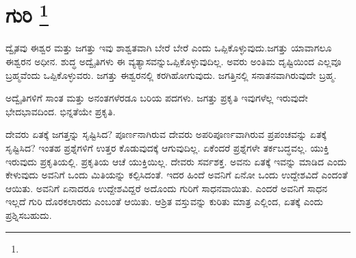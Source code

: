 
\chapter[ಗುರಿ ]{ಗುರಿ \protect\footnote{}}

ದ್ವೈತವು ಈಶ್ವರ ಮತ್ತು ಜಗತ್ತು ಇವು ಶಾಶ್ವತವಾಗಿ ಬೇರೆ ಬೇರೆ ಎಂದು ಒಪ್ಪಿಕೊಳ್ಳುವುದು.\break ಜಗತ್ತು ಯಾವಾಗಲೂ ಈಶ್ವರನ ಅಧೀನ. ಶುದ್ಧ ಅದ್ವೈತಿಗಳು ಈ ವ್ಯತ್ಯಾಸವನ್ನು\break ಒಪ್ಪಿಕೊಳ್ಳುವುದಿಲ್ಲ. ಅವರು ಅಂತಿಮ ದೃಷ್ಟಿಯಿಂದ ಎಲ್ಲವೂ ಬ್ರಹ್ಮವೆಂದು ಒಪ್ಪಿಕೊಳ್ಳುವರು. ಜಗತ್ತು ಈಶ್ವರನಲ್ಲಿ ಕರಗಿಹೋಗುವುದು. ಜಗತ್ತಿನಲ್ಲಿ ಸನಾತನವಾಗಿರುವುದೇ ಬ್ರಹ್ಮ.

ಅದ್ವೈತಿಗಳಿಗೆ ಸಾಂತ ಮತ್ತು ಅನಂತಗಳೆರಡೂ ಬರಿಯ ಪದಗಳು. ಜಗತ್ತು ಪ್ರಕೃತಿ ಇವುಗಳೆಲ್ಲ ಇರುವುದೇ ಭೇದಭಾವದಿಂದ. ಭಿನ್ನತೆಯೇ ಪ್ರಕೃತಿ.

ದೇವರು ಏತಕ್ಕೆ ಜಗತ್ತನ್ನು ಸೃಷ್ಟಿಸಿದ? ಪೂರ್ಣನಾಗಿರುವ ದೇವರು ಅಪರಿಪೂರ್ಣವಾಗಿರುವ ಪ್ರಪಂಚವನ್ನು ಏತಕ್ಕೆ ಸೃಷ್ಟಿಸಿದ? ಇಂತಹ ಪ್ರಶ್ನೆಗಳಿಗೆ ಉತ್ತರ ಕೊಡುವುದಕ್ಕೆ ಆಗುವುದಿಲ್ಲ. ಏಕೆಂದರೆ ಪ್ರಶ್ನೆಗಳೇ ತರ್ಕಬದ್ಧವಲ್ಲ. ಯುಕ್ತಿ ಇರುವುದು ಪ್ರಕೃತಿಯಲ್ಲಿ. ಪ್ರಕೃತಿಯ ಆಚೆ ಯುಕ್ತಿಯಿಲ್ಲ. ದೇವರು ಸರ್ವಶಕ್ತ. ಅವನು ಏತಕ್ಕೆ ಇವನ್ನು ಮಾಡಿದ ಎಂದು ಕೇಳುವುದು ಅವನಿಗೆ ಒಂದು ಮಿತಿಯನ್ನು ಕಲ್ಪಿಸಿದಂತೆ. ಇದರ ಹಿಂದೆ ಅವನಿಗೆ ಏನೋ ಒಂದು ಉದ್ದೇಶವಿದೆ ಎಂದಂತೆ ಆಯಿತು. ಅವನಿಗೆ ಏನಾದರೂ ಉದ್ದೇಶವಿದ್ದರೆ ಅದೊಂದು ಗುರಿಗೆ ಸಾಧನವಾಯಿತು. ಎಂದರೆ ಅವನಿಗೆ ಸಾಧನ ಇಲ್ಲದೆ ಗುರಿ ದೊರಕಲಾರದು ಎಂಬಂತೆ ಆಯಿತು. ಆಶ್ರಿತ ವಸ್ತುವನ್ನು ಕುರಿತು ಮಾತ್ರ ಎಲ್ಲಿಂದ, ಏತಕ್ಕೆ ಎಂದು ಪ್ರಶ್ನಿಸಬಹುದು.

\vskip -0.5cm

